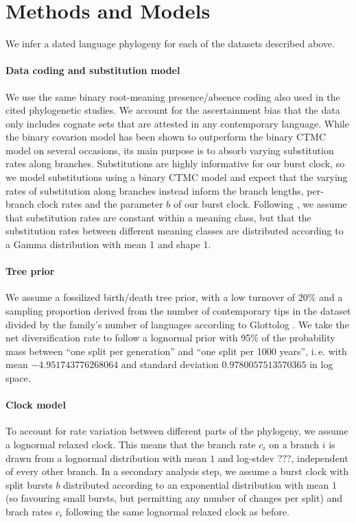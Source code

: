 \documentclass[a4paper,12pt]{scrartcl}
\begin{document}
\section{Methods and Models}
We infer a dated language phylogeny for each of the datasets described above.
\paragraph{Data coding and substitution model}
We use the same binary root-meaning presence/absence coding also used in the
cited phylogenetic studies. We account for the ascertainment bias that the data
only includes cognate sets that are attested in any contemporary language.
While the binary covarion model has been shown to outperform the binary CTMC
model on several occasions, its main purpose is to absorb varying substitution
rates along branches. Substitutions are highly informative for our burst clock,
so we model substitutions using a binary CTMC model and expect that the varying
rates of substitution along branches instead inform the branch lengths,
per-branch clock rates and the parameter $b$ of our burst clock.
Following \parencite{}, we assume that substitution rates are constant within a
meaning class, but that the substitution rates between different meaning classes
are distributed according to a Gamma distribution with mean 1 and shape 1.

\paragraph{Tree prior} We assume a fossilized birth/death tree prior, with a low
turnover of 20\% \parencite{} and a sampling proportion derived from the number
of contemporary tips in the dataset divided by the family's number of languages
according to Glottolog \parencite{glottolog}. We take the net diversification
rate to follow a lognormal prior with 95\% of the probability mass between “one
split per generation” and “one split per 1000 years”,
i.\,e. with mean $-4.951743776268064$ and standard deviation $0.9780057513570365$ in log space.

\paragraph{Clock model}
To account for rate variation between different parts of the phylogeny, we
assume a lognormal relaxed clock. This means that the branch rate $c_i$ on a
branch $i$ is drawn from a lognormal distribution with mean $1$ and log-stdev
$???$, independent of every other branch. In a secondary analysis step, we
assume a burst clock with split bursts $b$ distributed according to an
exponential distribution with mean $1$ (so favouring small bursts, but
permitting any number of changes per split) and brach rates $c_i$ following the
same lognormal relaxed clock as before.
\end{document}
